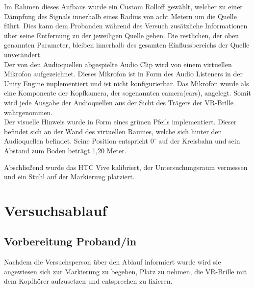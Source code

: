Im Rahmen dieses Aufbaus wurde ein Custom Rolloff gewählt, welcher zu einer Dämpfung des Signals innerhalb eines Radius von acht Metern um die Quelle führt. Dies kann dem Probanden während des Versuch zusätzliche Informationen über seine Entfernung zu der jeweiligen Quelle geben. Die restlichen, der oben genannten Parameter, bleiben innerhalb des gesamten Einflussbereichs der Quelle unverändert.\\
Der von den Audioquellen abgespielte Audio Clip wird von einem virtuellen Mikrofon aufgezeichnet. Dieses Mikrofon ist in Form des Audio Listeners in der Unity Engine implementiert und ist nicht konfigurierbar. Das Mikrofon wurde als eine Komponente der Kopfkamera, der sogenannten camera(ears), angelegt. Somit wird jede Ausgabe der Audioquellen aus der Sicht des Trägers der VR-Brille wahrgenommen.\\
Der visuelle Hinweis wurde in Form eines grünen Pfeils implementiert. Dieser befindet sich an der Wand des virtuellen Raumes, welche sich hinter den Audioquellen befindet. Seine Position entspricht $0^{\circ}$ auf der Kreisbahn und sein Abstand zum Boden beträgt 1,20 Meter.

Abschließend wurde das HTC Vive kalibriert, der Untersuchungsraum vermessen und ein Stuhl auf der Markierung platziert.

\newpage

\section{Versuchsablauf}
\subsection{Vorbereitung Proband/in}
Nachdem die Versuchsperson über den Ablauf informiert wurde wird sie angewiesen sich zur Markierung zu begeben, Platz zu nehmen, die VR-Brille mit dem Kopfhörer aufzusetzen und entsprechen zu fixieren.

